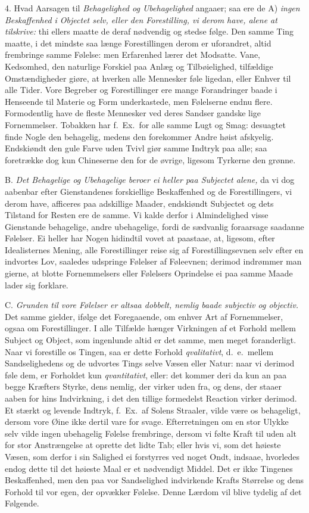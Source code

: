 \documentclass[12pt,a4paper]{article}
\newcommand{\opage}[1]{\marginnote{\footnotesize\textit{[#1]}}}
\begin{document}
4. Hvad Aarsagen til \emph{Behagelighed og Ubehagelighed} angaaer; saa ere de A)
\emph{ingen Beskaffenhed i Objectet selv, eller den Forestilling, vi derom have, alene at
tilskrive:} thi ellers maatte de deraf nødvendig og stedse følge. Den samme Ting maatte, i
det mindste saa længe Forestillingen derom er uforandret, altid frembringe samme Følelse:
men Erfarenhed lærer det Modsatte.
\opage{196} Vane, Kedsomhed, den naturlige Forskiel paa Anlæg og Tilbøielighed, tilfældige
Omstændigheder giøre, at hverken alle Mennesker føle ligedan, eller Enhver til alle Tider.
Vore Begreber og Forestillinger ere mange Forandringer baade i Henseende til Materie og
Form underkastede, men Følelserne endnu flere. Formodentlig have de fleste Mennesker ved
deres Sandser gandske lige Fornemmelser. Tobakken har f.~Ex.\ for alle samme Lugt og Smag:
desuagtet finde Nogle den behagelig, medens den forekommer Andre høist afskyelig.
Endskiøndt den gule Farve uden Tvivl giør samme Indtryk paa alle; saa foretrække dog kun
Chineserne den for de øvrige, ligesom Tyrkerne den grønne.

B. \emph{Det Behagelige og Ubehagelige beroer ei heller paa Subjectet alene,} da vi dog
aabenbar efter Gienstandenes forskiellige Beskaffenhed og de Forestillingers, vi derom
have, afficeres paa adskillige Maader, endskiøndt Subjectet og dets Tilstand for Resten
ere de samme. Vi kalde derfor i Almindelighed visse Gienstande behagelige, andre
ubehagelige, fordi de sædvanlig foraarsage saadanne Følelser. Ei heller har Nogen hidindtil
vovet at paastaae, at, ligesom, efter Idealisternes Mening, alle Forestillinger reise sig
af Forestillingsevnen selv efter en indvortes Lov, saaledes udspringe Følelser af
Føleevnen; derimod indrømmer man gierne, at blotte Fornemmelsers eller
\opage{197} Følelsers Oprindelse ei paa samme Maade lader sig forklare.

C. \emph{Grunden til vore Følelser er altsaa dobbelt, nemlig baade subjectiv og objectiv.}
Det samme gielder, ifølge det Foregaaende, om enhver Art af Fornemmelser, ogsaa om
Forestillinger. I alle Tilfælde hænger Virkningen af et Forhold mellem Subject og Object,
som ingenlunde altid er det samme, men meget foranderligt. Naar vi forestille os Tingen,
saa er dette Forhold \emph{qvalitativt}, d.~e.\ mellem Sandselighedens og de udvortes
Tings selve Væsen eller Natur: naar vi derimod føle dem, er Forholdet kun
\emph{qvantitativt}, eller: det kommer deri da kun an paa begge Kræfters Styrke, dens
nemlig, der virker uden fra, og dens, der staaer aaben for hins Indvirkning, i det den
tillige formedelst Reaction virker derimod. Et stærkt og levende Indtryk, f.~Ex.\ af
Solens Straaler, vilde være os behageligt, dersom vore Øine ikke dertil vare for svage.
Efterretningen om en stor Ulykke selv vilde ingen ubehagelig Følelse frembringe, dersom vi
følte Kraft til uden alt for stor Anstrængelse at oprette det lidte Tab; eller hvis vi, som
det høieste Væsen, som derfor i sin Salighed ei forstyrres ved noget Ondt, indsaae,
hvorledes endog dette til det høieste Maal er et nødvendigt Middel. Det er ikke Tingenes
Beskaffenhed, men den paa vor Sandselighed indvirkende Krafts Størrelse og dens Forhold til
vor
\opage{198} egen, der opvækker Følelse. Denne Lærdom vil blive tydelig af det Følgende.
\end{document}
